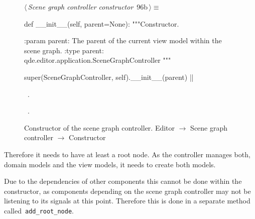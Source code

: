 \documentclass[%
    a4paper,    %
    justified,  %
    nobib,      %
    openany     %
]{tufte-book}
\makeatletter
\renewcommand{\label}[1]{\@tufte@label{##1}}%
\makeatother
\begin{document}
\begin{figure}[!htbp]
\begin{flushleft} \small
\begin{minipage}{\linewidth}\label{scrap26}\raggedright\small
{} $\langle\,${\itshape Scene graph controller constructor}\nobreak\ {\footnotesize {96b}}$\,\rangle\equiv$
\vspace{-1ex}
\begin{pythoncode}
def __init__(self, parent=None):
    """Constructor.

    :param parent: The parent of the current view model within
                    the scene graph.
    :type parent:  qde.editor.application.SceneGraphController
    """

    super(SceneGraphController, self).__init__(parent)
|\NWsep|
\end{pythoncode}
\vspace{1.5ex}
\footnotesize
\begin{list}{}{\setlength{\itemsep}{-\parsep}\setlength{\itemindent}{-\leftmargin}}
\item \NWtxtMacroDefBy\ .
\item \NWtxtMacroRefIn\ .

\item{}
\end{list}
\end{minipage}\vspace{4ex}
\end{flushleft}
\caption{Constructor of the scene graph controller.
  \newline{}\newline{}Editor $\rightarrow$ Scene graph controller $\rightarrow$
  Constructor}
\end{figure}

 Therefore
it needs to have at least a root node. As the controller manages both, domain
models and the view models, it needs to create both models.

Due to the dependencies of other components this cannot be done within the
constructor, as components depending on the scene graph controller may not be
listening to its signals at this point. Therefore this is done in a separate
method called~\verb=add_root_node=.
\end{document}
